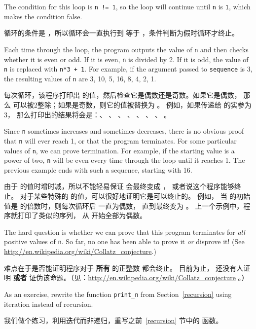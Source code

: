 %
The condition for this loop is {\tt n != 1}, so the loop will continue
until {\tt n} is {\tt 1}, which makes the condition false.

循环的条件是 ，所以循环会一直执行到  等于 ，条件判断为假时循环才终止。

Each time through the loop, the program outputs the value of {\tt n}
and then checks whether it is even or odd.  If it is even, {\tt n} is
divided by 2.  If it is odd, the value of {\tt n} is replaced with
{\tt n*3 + 1}. For example, if the argument passed to {\tt sequence}
is 3, the resulting values of {\tt n} are 3, 10, 5, 16, 8, 4, 2, 1.

每次循环，该程序打印出  的值，然后检查它是偶数还是奇数。如果它是偶数，
那么  可以被2整除；如果是奇数，则它的值被替换为 。 例如，如果传递给  的实参为3， 那么打印出的结果将会是：、 、 、 、 、 、 、 。

Since {\tt n} sometimes increases and sometimes decreases, there is no
obvious proof that {\tt n} will ever reach 1, or that the program
terminates.  For some particular values of {\tt n}, we can prove
termination.  For example, if the starting value is a power of two,
{\tt n} will be even every time through the loop
until it reaches 1. The previous example ends with such a sequence,
starting with 16.

由于  的值时增时减，所以不能轻易保证  会最终变成 ， 或者说这个程序能够终止。 对于某些特殊的  的值，可以很好地证明它是可以终止的。 例如， 当  的初始值是  的倍数时，则每次循环后  一直为偶数， 直到最终变为 。 上一个示例中，程序就打印了类似的序列， 从  开始全部为偶数。

The hard question is whether we can prove that this program terminates
for {\em all} positive values of {\tt n}.  So far, no one has
been able to prove it {\em or} disprove it!  (See
  \url{http://en.wikipedia.org/wiki/Collatz_conjecture}.)

难点在于是否能证明程序对于 {\bf 所有} 的正整数  都会终止。 目前为止，
还没有人证明 {\bf 或者} 证伪该命题。（见：\url{http://en.wikipedia.org/wiki/Collatz_conjecture} 。）

As an exercise, rewrite the function \verb"print_n" from
Section~\ref{recursion} using iteration instead of recursion.

我们做个练习，利用迭代而非递归，重写之前~\ref{recursion} 节中的  函数。


